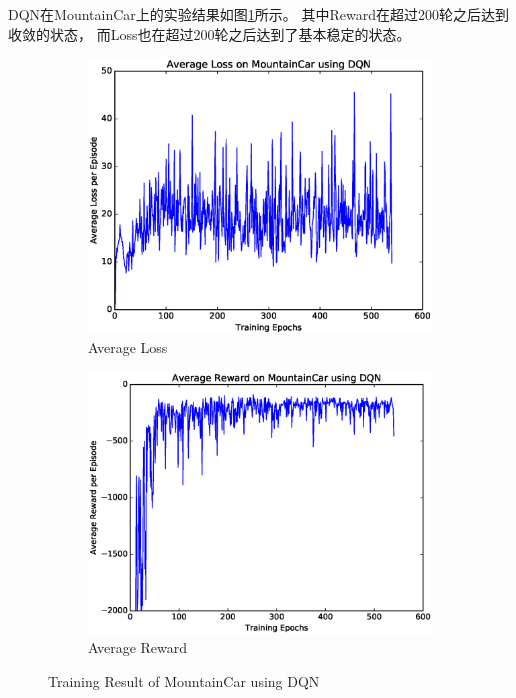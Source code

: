 \documentclass[a4paper,UTF8]{article}
\theoremstyle{definition}
\begin{document}
DQN在MountainCar上的实验结果如图\ref{fig:car-dqn}所示。
其中Reward在超过200轮之后达到收敛的状态，
而Loss也在超过200轮之后达到了基本稳定的状态。

\begin{figure}[H]
	\centering
	\begin{subfigure}[t]{0.5\textwidth}
		\centering
		\includegraphics[scale=0.35]{figures/car-dqn-loss}
		\caption{Average Loss}
	\end{subfigure}%
	\begin{subfigure}[t]{0.5\textwidth}
		\centering
		\includegraphics[scale=0.35]{figures/car-dqn-reward}
		\caption{Average Reward}
	\end{subfigure}
	\caption{Training Result of MountainCar using DQN}\label{fig:car-dqn}
\end{figure}
\end{document}
